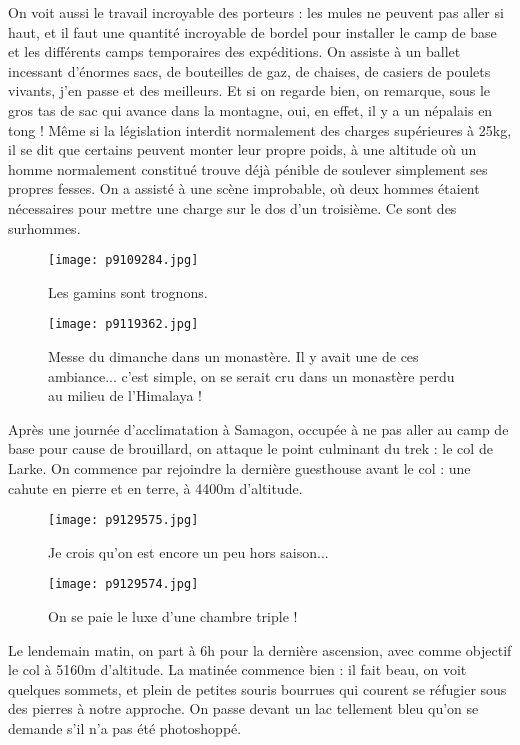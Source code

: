 \documentclass{book}
\begin{document}
On voit aussi le travail incroyable des porteurs : les mules ne peuvent pas aller si haut, et il faut une quantité incroyable de bordel pour installer le camp de base et les différents camps temporaires des expéditions. On assiste à un ballet incessant d'énormes sacs, de bouteilles de gaz, de chaises, de casiers de poulets vivants, j'en passe et des meilleurs. Et si on regarde bien, on remarque, sous le gros tas de sac qui avance dans la montagne, oui, en effet, il y a un népalais en tong ! Même si la législation interdit normalement des charges supérieures à 25kg, il se dit que certains peuvent monter leur propre poids, à une altitude où un homme normalement constitué trouve déjà pénible de soulever simplement ses propres fesses. On a assisté à une scène improbable, où deux hommes étaient nécessaires pour mettre une charge sur le dos d'un troisième. Ce sont des surhommes.


\begin{figure}[h]
\centering
\texttt{[image: p9109284.jpg]}
\caption*{Les gamins sont trognons.}
\end{figure}


\begin{figure}[h]
\centering
\texttt{[image: p9119362.jpg]}
\caption*{Messe du dimanche dans un monastère. Il y avait une de ces ambiance... c'est simple, on se serait cru dans un monastère perdu au milieu de l'Himalaya !}
\end{figure}

Après une journée d'acclimatation à Samagon, occupée à ne pas aller au camp de base pour cause de brouillard, on attaque le point culminant du trek : le col de Larke. On commence par rejoindre la dernière guesthouse avant le col : une cahute en pierre et en terre, à 4400m d'altitude.


\begin{figure}[h]
\centering
\texttt{[image: p9129575.jpg]}
\caption*{Je crois qu'on est encore un peu hors saison...}
\end{figure}


\begin{figure}[h]
\centering
\texttt{[image: p9129574.jpg]}
\caption*{On se paie le luxe d'une chambre triple !}
\end{figure}

Le lendemain matin, on part à 6h pour la dernière ascension, avec comme objectif le col à 5160m d'altitude. La matinée commence bien : il fait beau, on voit quelques sommets, et plein de petites souris bourrues qui courent se réfugier sous des pierres à notre approche. On passe devant un lac tellement bleu qu'on se demande s'il n'a pas été photoshoppé.
\end{document}
